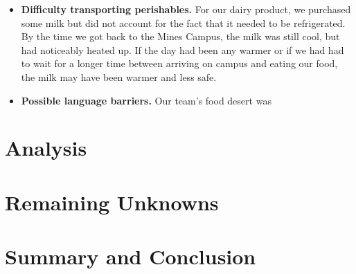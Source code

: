 \documentclass[11pt]{article}
\begin{document}
\begin{itemize}
    \item \textbf{Difficulty transporting perishables.} For our dairy product, we purchased some
        milk but did not account for the fact that it needed to be refrigerated. By the time we got
        back to the Mines Campus, the milk was still cool, but had noticeably heated up. If the day
        had been any warmer or if we had had to wait for a longer time between arriving on campus
        and eating our food, the milk may have been warmer and less safe.

    \item \textbf{Possible language barriers.} Our team's food desert was 

\end{itemize}

\section{Analysis}

\section{Remaining Unknowns}

\section{Summary and Conclusion}
\end{document}
